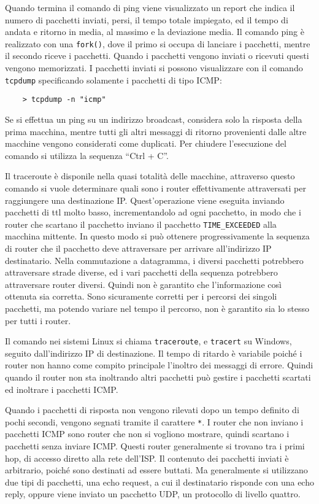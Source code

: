 \documentclass{article}
\numberwithin{equation}{subsection}
\begin{document}
Quando termina il comando di ping viene visualizzato un report che indica il numero di pacchetti inviati, persi, il tempo totale impiegato, ed il tempo di andata e 
ritorno in media, al massimo e la deviazione media. 
Il comando ping è realizzato con una \verb|fork()|, dove il primo si occupa di lanciare i pacchetti, mentre il secondo riceve i pacchetti. Quando i pacchetti vengono 
inviati o ricevuti questi vengono memorizzati. I pacchetti inviati si possono visualizzare con il comando \verb|tcpdump| specificando solamente i pacchetti di tipo ICMP:
\begin{verbatim}
    > tcpdump -n "icmp"
\end{verbatim}

Se si effettua un ping su un indirizzo broadcast, considera solo la risposta della prima macchina, mentre tutti gli altri messaggi di ritorno provenienti dalle 
altre macchine vengono considerati come duplicati. 
Per chiudere l'esecuzione del comando si utilizza la sequenza ``Ctrl + C''. 


Il traceroute è disponile nella quasi totalità delle macchine, attraverso questo comando si vuole determinare quali sono i router effettivamente attraversati 
per raggiungere una destinazione IP. 
Quest'operazione viene eseguita inviando pacchetti di ttl molto basso, incrementandolo ad ogni pacchetto, in modo che i router che scartano il pacchetto inviano 
il pacchetto \verb|TIME_EXCEEDED| alla macchina mittente. In questo modo si può ottenere progressivamente la sequenza di router che il pacchetto deve 
attraversare per arrivare all'indirizzo IP destinatario. 
Nella commutazione a datagramma, i diversi pacchetti potrebbero attraversare strade diverse, ed i vari pacchetti della sequenza potrebbero attraversare router 
diversi. Quindi non è garantito che l'informazione così ottenuta sia corretta. Sono sicuramente corretti per i percorsi dei singoli pacchetti, ma potendo 
variare nel tempo il percorso, non è garantito sia lo stesso per tutti i router. 

Il comando nei sistemi Linux si chiama \verb|traceroute|, e \verb|tracert| su Windows, seguito dall'indirizzo IP di destinazione. Il tempo di ritardo è variabile 
poiché i router non hanno come compito principale l'inoltro dei messaggi di errore. Quindi quando il router non sta inoltrando altri pacchetti può gestire 
i pacchetti scartati ed inoltrare i pacchetti ICMP. 


Quando i pacchetti di risposta non vengono rilevati dopo un tempo definito di pochi secondi, vengono segnati tramite il carattere \verb|*|. I router che non inviano i 
pacchetti ICMP sono router che non si vogliono mostrare, quindi scartano i pacchetti senza inviare ICMP. Questi router generalmente si trovano tra i primi 
hop, di accesso diretto alla rete dell'ISP. 
Il contenuto dei pacchetti inviati è arbitrario, poiché sono destinati ad essere buttati. Ma generalmente si utilizzano due tipi di pacchetti, una echo request, 
a cui il destinatario risponde con una echo reply, oppure viene inviato un pacchetto UDP, un protocollo di livello quattro. 
\end{document}
